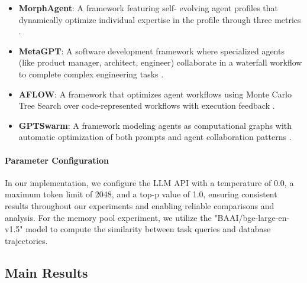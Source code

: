 \documentclass{article}
\begin{document}
\begin{itemize}
    \begin{itemize}
    \item \textbf{MorphAgent}: A framework featuring self-
    evolving agent profiles that dynamically optimize individual expertise in the profile through three metrics \cite{lu2024morphagent}.
    \item \textbf{MetaGPT}: A software development framework where specialized agents (like product manager, architect, engineer) collaborate in a waterfall workflow to complete complex engineering tasks \cite{hong2024metagptmetaprogrammingmultiagent}.
    \item \textbf{AFLOW}: A framework that optimizes agent workflows using Monte Carlo Tree Search over code-represented workflows with execution feedback \cite{zhang2024aflow}.
    \item \textbf{GPTSwarm}: A framework modeling agents as computational graphs with automatic optimization of both prompts and agent collaboration patterns \cite{zhuge2024gptswarm}.
\end{itemize}
\end{itemize}

\paragraph{Parameter Configuration}
In our implementation, we configure the LLM API with a temperature of 0.0, a maximum token limit of 2048, and a top-p value of 1.0, ensuring consistent results throughout our experiments and enabling reliable comparisons and analysis. For the memory pool experiment, we utilize the "BAAI/bge-large-en-v1.5" model to compute the similarity between task queries and database trajectories.


\subsection{Main Results}
\end{document}
